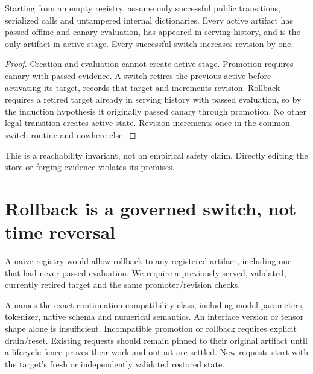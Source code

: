 \par\medskip\noindent\begin{minipage}{\linewidth}
\begin{proposition}
Starting from an empty registry, assume only successful public transitions,
serialized calls and untampered internal dictionaries. Every active artifact
has passed offline and canary evaluation, has appeared in serving history,
and is the only artifact in active stage. Every successful switch increases
revision by one.
\end{proposition}
\begin{proof}
Creation and evaluation cannot create active stage. Promotion requires canary
with passed evidence. A switch retires the previous active before activating
its target, records that target and increments revision. Rollback requires
a retired target already in serving history with passed evaluation, so by
the induction hypothesis it originally passed canary through promotion.
No other legal transition creates active state. Revision increments once in
the common switch routine and nowhere else.
\end{proof}
\end{minipage}\par\medskip
This is a reachability invariant, not an empirical safety claim. Directly
editing the store or forging evidence violates its premises.

\section{Rollback is a governed switch, not time reversal}
\label{evod43:rollback}
A naive registry would allow rollback to any registered artifact, including one
that had never passed evaluation. We require a previously served, validated,
currently retired target and the same promoter/revision checks.

A  names the exact continuation compatibility class,
including model parameters, tokenizer, native schema and numerical semantics.
An interface version or tensor shape alone is insufficient. Incompatible
promotion or rollback requires explicit drain/reset. Existing requests should
remain pinned to their original artifact until a lifecycle fence proves their
work and output are settled. New requests start with the target's fresh or
independently validated restored state.

